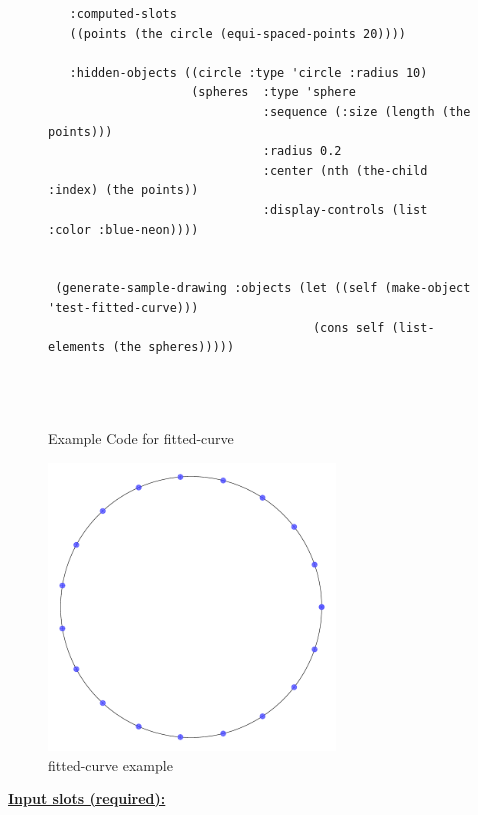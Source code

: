 \documentclass [11pt]{book}
\begin{document}
\begin{itemize}
\begin{figure}
\begin{lrbox}{\boxedverb}
\begin{minipage}{\linewidth}
{\begin{verbatim}
   :computed-slots
   ((points (the circle (equi-spaced-points 20))))

   :hidden-objects ((circle :type 'circle :radius 10)
                    (spheres  :type 'sphere
                              :sequence (:size (length (the points)))
                              :radius 0.2
                              :center (nth (the-child :index) (the points))
                              :display-controls (list :color :blue-neon))))


 (generate-sample-drawing :objects (let ((self (make-object 'test-fitted-curve)))
                                     (cons self (list-elements (the spheres)))))


 
\end{verbatim}}
\end{minipage}
\end{lrbox}
\fbox{\usebox{\boxedverb}}

\caption{Example Code for fitted-curve}

\label{fig:example-code-fitted-curve}

\end{figure}

\begin{figure}
\begin{center}
\includegraphics[width=3in,height=3in]{../images/example-fitted-curve.pdf}
\end{center}

\caption{fitted-curve example}

\label{fig:fitted-curve}

\end{figure}





\textbf{
\underline{Input slots (required):}}


\end{itemize}
\end{document}
